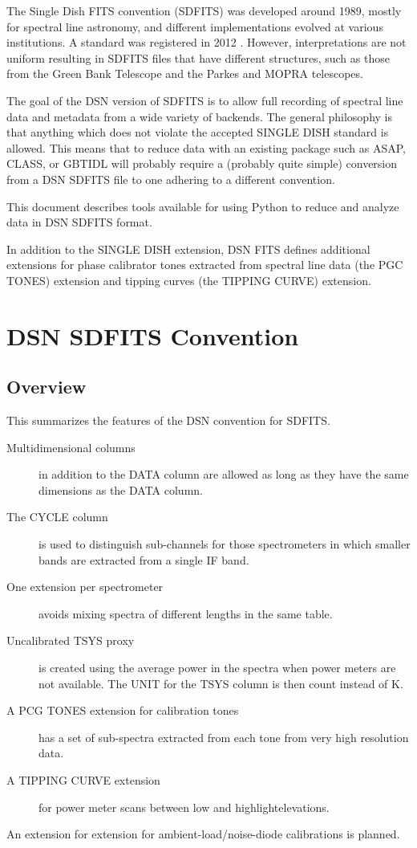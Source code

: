 \documentclass[letterpaper,11pt]{book}
\begin{document}
The Single Dish FITS convention \cite{Liszt1995} (SDFITS) was developed around
1989, mostly for spectral line astronomy, and different implementations evolved
at various institutions.  A standard was registered in 2012 \cite{Pence2012}.
However, interpretations are not uniform resulting in SDFITS files that have
different structures, such as those from the Green Bank Telescope and the Parkes
and MOPRA telescopes.

The goal of the DSN version of SDFITS is to allow full recording of spectral
line data and metadata from a wide variety of backends. The general philosophy
is that anything which does not violate the accepted SINGLE DISH standard is
allowed.  This means that to reduce data with an existing package such as
ASAP, CLASS, or GBTIDL will probably require a (probably quite simple) conversion
from a DSN SDFITS file to one adhering to a different convention.

This document describes tools available for using Python to reduce and analyze
data in DSN SDFITS format.

In addition to the SINGLE DISH extension, DSN FITS defines additional extensions
for phase calibrator tones extracted from spectral line data (the PGC TONES) 
extension and tipping curves (the TIPPING CURVE) extension.

\chapter{DSN SDFITS Convention}\label{chap:conventions}

\section{Overview}

This summarizes the features of the DSN convention for SDFITS.
\begin{description}
\item[Multidimensional columns] in addition to the DATA column are allowed as
long as they have the same dimensions as the DATA column.
\item[The {\ttfamily CYCLE} column] is used to distinguish sub-channels for
those spectrometers in which smaller bands are extracted from a single IF band.
\item[One extension per spectrometer] avoids mixing spectra of different lengths
in the same table.
\item[Uncalibrated {\ttfamily TSYS} proxy] is created using the average power
in the spectra when power meters are not available. The UNIT for the TSYS 
column is then {\ttfamily count} instead of {\ttfamily K}.
\item[A {\ttfamily PCG TONES} extension for calibration tones] has a set of
sub-spectra extracted from each tone from very high resolution data.
\item[A TIPPING CURVE extension] for power meter scans between low and highlightelevations.
\end{description}
An extension for extension for ambient-load/noise-diode calibrations is planned.
\end{document}
